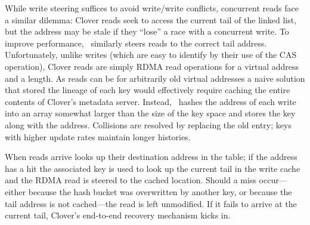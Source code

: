 While write steering suffices to avoid write/write conflicts,
concurrent reads face a similar dilemma: Clover reads seek to access
the current tail of the linked list, but the address may be stale if
they ``lose'' a race with a concurrent write.  To improve performance,
\sword\ similarly steers reads to the correct tail address.
%
Unfortunately, unlike writes (which are easy to identify by their use
of the CAS operation), Clover reads are simply RDMA read operations
for a virtual address and a length.
As reads can be for arbitrarily old virtual addresses a naive solution
that stored the lineage of each key would effectively require caching
the entire contents of Clover's metadata server.  Instead,
\sword\ hashes the address of each write into an array somewhat larger
than the size of the key space and stores the key along with the
address.  Collisions are resolved by replacing the old
entry; keys with higher update rates
maintain longer histories.

When reads arrive {\sword} looks up their destination address in the
table; if the address has a hit the associated key is used to look up
the current tail in the write cache and the RDMA read is steered to
the cached location.  Should a miss occur---either because the hash
bucket was overwritten by another key, or because the tail address is
not cached---the read is left unmodified.  If it fails to arrive at
the current tail, Clover's end-to-end recovery mechanism kicks in.


